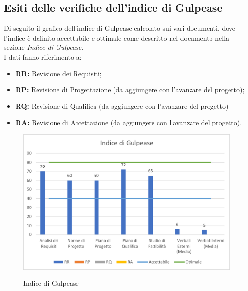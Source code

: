 \subsection{Esiti delle verifiche dell'indice di Gulpease}
Di seguito il grafico dell'indice di Gulpease calcolato sui vari documenti, dove l'indice è definito accettabile e ottimale come descritto nel documento \NdPv{} nella sezione \textit{Indice di Gulpease}.\\
I dati fanno riferimento a:
\begin{itemize}
	\item \textbf{RR:} Revisione dei Requisiti;
	\item \textbf{RP:} Revisione di Progettazione (da aggiungere con l'avanzare del progetto);
	\item \textbf{RQ:} Revisione di Qualifica (da aggiungere con l'avanzare del progetto);
	\item \textbf{RA:} Revisione di Accettazione (da aggiungere con l'avanzare del progetto).
\end{itemize} 

\begin{figure}[H]
\centering
\includegraphics[scale=0.90]{res/ResocontoAttivitaDiVerifica/res/img/indiceGulpease.png}\\
\caption{Indice di Gulpease}
\end{figure}

